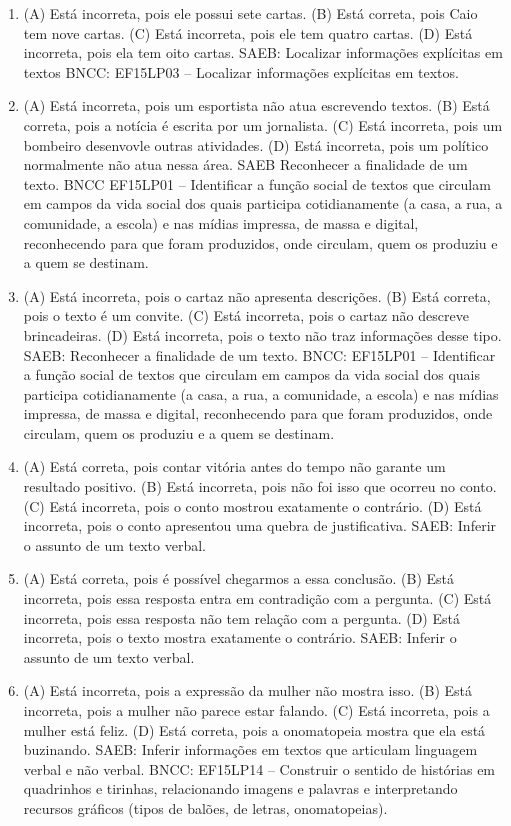 \begin{enumerate}
\item
(A) Está incorreta, pois ele possui sete cartas.
(B) Está correta, pois Caio tem nove cartas.
(C) Está incorreta, pois ele tem quatro cartas.
(D) Está incorreta, pois ela tem oito cartas.
SAEB: Localizar informações explícitas em textos
BNCC: EF15LP03 -- Localizar informações explícitas em textos.

\item
(A) Está incorreta, pois um esportista não atua escrevendo textos.
(B) Está correta, pois a notícia é escrita por um jornalista.
(C) Está incorreta, pois um bombeiro desenvovle outras atividades.
(D) Está incorreta, pois um político normalmente não atua nessa área.
SAEB Reconhecer a finalidade de um texto.
BNCC EF15LP01 -- Identificar a função social de textos que circulam em
campos da vida social dos quais participa cotidianamente (a casa, a rua,
a comunidade, a escola) e nas mídias impressa, de massa e digital,
reconhecendo para que foram produzidos, onde circulam, quem os produziu
e a quem se destinam.

\item
(A) Está incorreta, pois o cartaz não apresenta descrições.
(B) Está correta, pois o texto é um convite.
(C) Está incorreta, pois o cartaz não descreve brincadeiras.
(D) Está incorreta, pois o texto não traz informações desse tipo.
SAEB: Reconhecer a finalidade de um texto.
BNCC: EF15LP01 -- Identificar a função social de textos que circulam em
campos da vida social dos quais participa cotidianamente (a casa, a rua,
a comunidade, a escola) e nas mídias impressa, de massa e digital,
reconhecendo para que foram produzidos, onde circulam, quem os produziu
e a quem se destinam.

\item
(A) Está correta, pois contar vitória antes do tempo não garante um resultado positivo.
(B) Está incorreta, pois não foi isso que ocorreu no conto.
(C) Está incorreta, pois o conto mostrou exatamente o contrário.
(D) Está incorreta, pois o conto apresentou uma quebra de justificativa.
SAEB: Inferir o assunto de um texto verbal.

\item
(A) Está correta, pois é possível chegarmos a essa conclusão.
(B) Está incorreta, pois essa resposta entra em contradição com a pergunta.
(C) Está incorreta, pois essa resposta não tem relação com a pergunta.
(D) Está incorreta, pois o texto mostra exatamente o contrário.
SAEB: Inferir o assunto de um texto verbal.

\item
(A) Está incorreta, pois a expressão da mulher não mostra isso.
(B) Está incorreta, pois a mulher não parece estar falando.
(C) Está incorreta, pois a mulher está feliz.
(D) Está correta, pois a onomatopeia mostra que ela está buzinando.
SAEB: Inferir informações em textos que articulam linguagem
verbal e não verbal.
BNCC: EF15LP14 -- Construir o sentido de histórias em quadrinhos
e tirinhas, relacionando imagens e palavras e interpretando recursos
gráficos (tipos de balões, de letras, onomatopeias).
\end{enumerate}